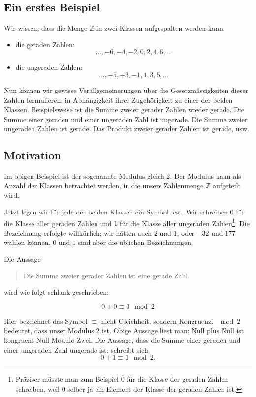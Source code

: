 \documentclass[%
11pt,%
twoside,%
titlepage,%
swissgerman,%
headsepline%
]{scrartcl}
\newcommand{\definition}[1]{\colorbox{emerald}{#1}}
\theoremstyle{definition}
\theoremstyle{plain}
\begin{document}
\subsection{Ein erstes Beispiel}

Wir wissen, dass die Menge $\mathbb{Z}$ in zwei Klassen aufgespalten werden kann.

\begin{itemize}
\item die geraden Zahlen:
$$\dots,-6,-4,-2,0,2,4,6,\dots$$
\item die ungeraden Zahlen:
$$\dots,-5,-3,-1,1,3,5,\dots$$
\end{itemize}

Nun können wir gewisse Verallgemeinerungen über die Gesetzmässigkeiten dieser Zahlen formulieren; in Abhängigkeit ihrer Zugehörigkeit zu einer der beiden Klassen. Beispielsweise ist die Summe zweier gerader Zahlen wieder gerade. Die Summe einer geraden und einer ungeraden Zahl ist ungerade. Die Summe zweier ungeraden Zahlen ist gerade. Das Produkt zweier gerader Zahlen ist gerade, usw.

\subsection{Motivation}

Im obigen Beispiel ist der sogenannte \definition{Modulus} gleich $2$. Der Modulus kann als Anzahl der Klassen betrachtet werden, in die unsere Zahlenmenge $\mathbb{Z}$ aufgeteilt wird.

Jetzt legen wir für jede der beiden Klassen ein Symbol fest. Wir schreiben $0$ für die Klasse aller geraden Zahlen und $1$ für die Klasse aller ungeraden Zahlen\footnote{Präziser müsste man zum Beispiel $\overline{0}$ für die Klasse der geraden Zahlen schreiben, weil $0$ selber ja ein Element der Klasse der geraden Zahlen ist.}. Die Bezeichnung erfolgte willkürlich; wir hätten auch $2$ und $1$, oder $-32$ und $177$ wählen können. $0$ und $1$ sind aber die üblichen Bezeichnungen.

Die Aussage

\begin{quote}
Die Summe zweier gerader Zahlen ist eine gerade Zahl.
\end{quote}

wird wie folgt schlank geschrieben:

$$0+0\equiv0\mod 2$$

Hier bezeichnet das Symbol $\equiv$ nicht Gleichheit, sondern \definition{Kongruenz}. $\mod 2$ bedeutet, dass unser Modulus $2$ ist. Obige Aussage liest man: \glqq Null plus Null ist kongruent Null Modulo Zwei\grqq. Die Aussage, dass die Summe einer geraden und einer ungeraden Zahl ungerade ist, schreibt sich
$$0+1\equiv1\mod2.$$
\end{document}
